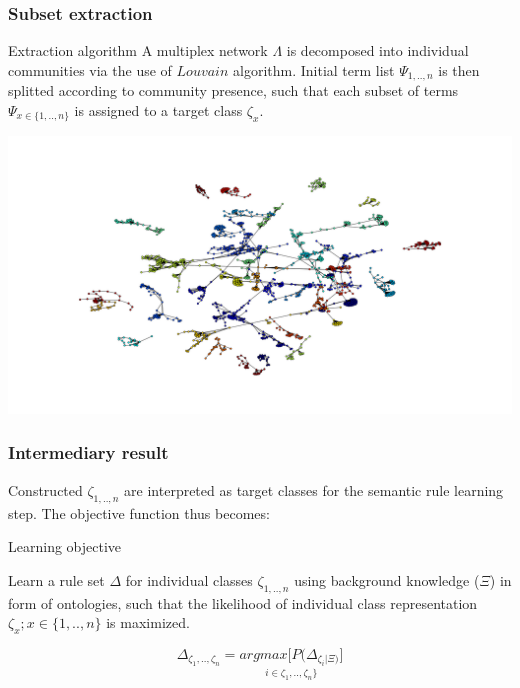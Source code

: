 \documentclass{beamer}
\begin{document}
\begin{frame}\frametitle{Subset extraction}

  \begin{block}{Extraction algorithm}
    A multiplex network $ \Lambda $ is decomposed into individual communities via the use of $Louvain$ algorithm. Initial term list $\Psi_{1,..,n} $ is then splitted according to community presence, such that each subset of terms $ \Psi_{x \in \{1,..,n\}} $ is assigned to a target class $ \zeta_{x} $.
  \end{block}
  \begin{center}
 \includegraphics[scale=0.15]{images/biomine_community}
  \end{center}

\end{frame}

\begin{frame}\frametitle{Intermediary result}

 Constructed $\zeta_{1,..,n}$  are interpreted as target classes for the semantic rule learning step. The objective function thus becomes:

  \begin{alertblock}{Learning objective}

    Learn a rule set $\Delta$  for individual classes $\zeta_{1,..,n}$ using background knowledge ($\Xi$) in form of ontologies, such that the likelihood of individual class representation $\zeta_{x};x \in \{1,..,n\}$ is maximized.

    \begin{equation}
      \Delta_{\zeta_{1},..,\zeta_{n}} = \underset{i \in \zeta_{1},..,\zeta_{n}\}}{argmax \Big[P(
        \Delta_{\zeta_{i}|\Xi)} \Big]}
    \end{equation}
    
    \end{alertblock}
  
  \end{frame}
\end{document}
